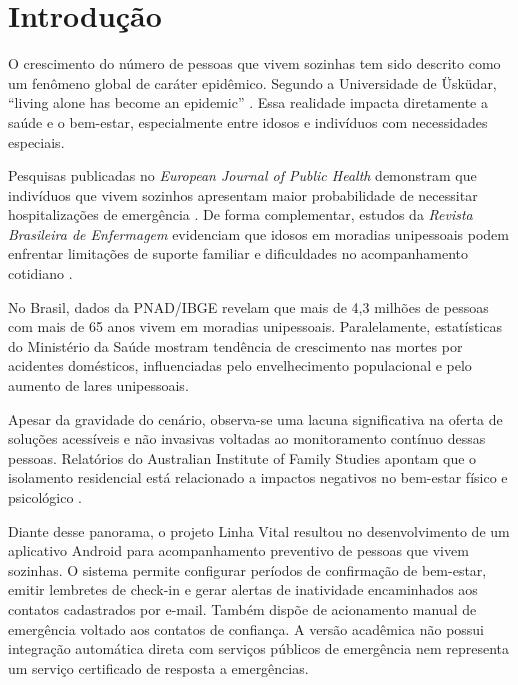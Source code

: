 \chapter{Introdução}

O crescimento do número de pessoas que vivem sozinhas tem sido descrito como um fenômeno global de caráter epidêmico. Segundo a Universidade de Üsküdar, ``living alone has become an epidemic'' \cite{erdogan2024}. Essa realidade impacta diretamente a saúde e o bem-estar, especialmente entre idosos e indivíduos com necessidades especiais.

Pesquisas publicadas no \textit{European Journal of Public Health} demonstram que indivíduos que vivem sozinhos apresentam maior probabilidade de necessitar hospitalizações de emergência \cite{pimouguet2017}. De forma complementar, estudos da \textit{Revista Brasileira de Enfermagem} evidenciam que idosos em moradias unipessoais podem enfrentar limitações de suporte familiar e dificuldades no acompanhamento cotidiano \cite{perseguino2017}.

No Brasil, dados da PNAD/IBGE revelam que mais de 4,3 milhões de pessoas com mais de 65 anos vivem em moradias unipessoais. Paralelamente, estatísticas do Ministério da Saúde mostram tendência de crescimento nas mortes por acidentes domésticos, influenciadas pelo envelhecimento populacional e pelo aumento de lares unipessoais.

Apesar da gravidade do cenário, observa-se uma lacuna significativa na oferta de soluções acessíveis e não invasivas voltadas ao monitoramento contínuo dessas pessoas. Relatórios do Australian Institute of Family Studies apontam que o isolamento residencial está relacionado a impactos negativos no bem-estar físico e psicológico \cite{aifs2014}.

Diante desse panorama, o projeto Linha Vital resultou no desenvolvimento de um aplicativo Android para acompanhamento preventivo de pessoas que vivem sozinhas. O sistema permite configurar períodos de confirmação de bem-estar, emitir lembretes de check-in e gerar alertas de inatividade encaminhados aos contatos cadastrados por e-mail. Também dispõe de acionamento manual de emergência voltado aos contatos de confiança. A versão acadêmica não possui integração automática direta com serviços públicos de emergência nem representa um serviço certificado de resposta a emergências.

